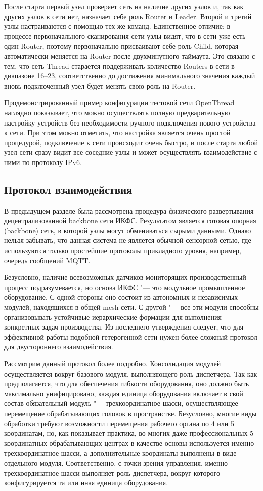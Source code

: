 После старта первый узел проверяет сеть на наличие других узлов и, так как других узлов в сети нет, назначает себе роль Router и Leader. Второй и третий узлы настраиваются с помощью тех же команд. Единственное отличие: в процессе первоначального сканирования сети узлы видят, что в сети уже есть один Router, поэтому первоначально присваивают себе роль Child, которая автоматически меняется на Router после двухминутного таймаута. Это связано с тем, что сеть Thread старается поддерживать количество Routers в сети в диапазоне 16--23, соответственно до достижения минимального значения каждый вновь подключенный узел будет менять свою роль на Router.

Продемонстрированный пример конфигурации тестовой сети OpenThread наглядно показывает, что можно осуществлять полную предварительную настройку устройств без необходимости ручного подключения нового устройства к сети. При этом можно отметить, что настройка является очень простой процедурой, подключение к сети происходит очень быстро, и после старта любой узел сети сразу видит все соседние узлы и может осуществлять взаимодействие с ними по протоколу IPv6.

\subsection{Протокол взаимодействия}

В предыдущем разделе была рассмотрена процедура физического развертывания децентрализованной backbone сети ИКФС. Результатом является готовая опорная  (backbone) сеть, в которой узлы могут обмениваться сырыми данными. Однако нельзя забывать, что данная система не является обычной сенсорной сетью, где используются только простейшие протоколы прикладного уровня, например, очередь сообщений MQTT.

Безусловно, наличие всевозможных датчиков мониторящих производственный процесс подразумевается, но основа ИКФС "--- это модульное промышленное оборудование. С одной стороны оно состоит из автономных и независимых модулей, находящихся в общей mesh-сети. С другой "--- все эти модули способны организовывать устойчивые иерархические формации для выполнения конкретных задач производства. Из последнего утверждения следует, что для эффективной работы подобной гетерогенной сети нужен более сложный протокол для двустороннего взаимодействия.

Рассмотрим данный протокол более подробно. Консолидация модулей осуществляется вокруг базового модуля, выполняющего роль диспетчера. Так как предполагается, что для обеспечения гибкости оборудования, оно должно быть максимально унифицировано, каждая единица оборудования включает в свой состав обязательный модуль "--- трехкоординатное шасси, осуществляющее перемещение обрабатывающих головок в пространстве. Безусловно, многие виды обработки требуют возможности перемещения рабочего органа по 4 или 5 координатам, но, как показывает практика, во многих даже профессиональных 5-координатных обрабатывающих центрах в качестве основы используется именно трехкоординатное шасси, а дополнительные координаты выполнены в виде отдельного модуля. Соответственно, с точки зрения управления, именно трехкоординатное шасси выполняет роль диспетчера, вокруг которого конфигурируется та или иная единица оборудования. 

